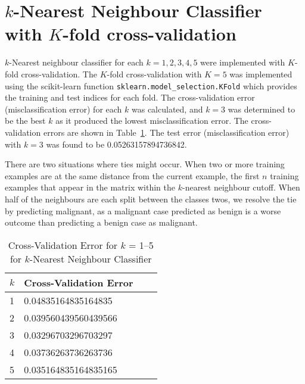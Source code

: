 \documentclass[12pt]{article}
\begin{document}
\clearpage
\section*{$k$-Nearest Neighbour Classifier with $K$-fold cross-validation}
$k$-Nearest neighbour classifier for each $k = 1,2,3,4,5$ were implemented with $K$-fold cross-validation. The $K$-fold cross-validation with $K = 5$ was implemented using the scikit-learn function \texttt{sklearn.model\_selection.KFold} which provides the training and test indices for each fold. The cross-validation error (misclassification error) for each $k$ was calculated, and $k = 3$ was determined to be the best $k$ as it produced the lowest misclassification error. The cross-validation errors are shown in Table~\ref{tab:kneigh}. The test error (misclassification error) with $k = 3$ was found to be 0.05263157894736842.

There are two situations where ties might occur. When two or more training examples are at the same distance from the current example, the first $n$ training examples that appear in the matrix within the $k$-nearest neighbour cutoff. When half of the neighbours are each split between the classes twos, we resolve the tie by predicting malignant, as a malignant case predicted as  benign is a worse outcome than predicting a benign case as malignant.

\begin{table}[htp]
\centering
\caption{Cross-Validation Error for $k$ = 1--5 for $k$-Nearest Neighbour Classifier}\label{tab:kneigh}
\begin{tabular}{|l|l|l|l|}
	\hline
	$k$	& Cross-Validation Error	\\ \hline\hline
	1  	& 0.04835164835164835		\\ \hline
	2  	& 0.039560439560439566		\\ \hline
	3  	& 0.03296703296703297		\\ \hline
	4  	& 0.03736263736263736		\\ \hline
	5  	& 0.035164835164835165		\\ \hline
\end{tabular}
\end{table}
\end{document}
